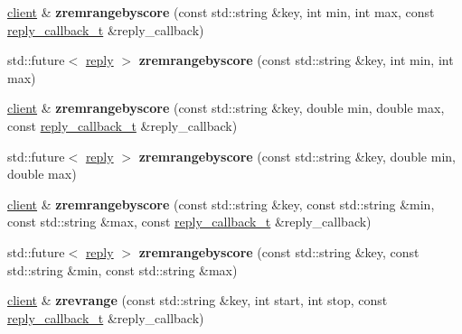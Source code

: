 \begin{DoxyCompactItemize}
\hyperlink{classcpp__redis_1_1client}{client} \& {\bfseries zremrangebyscore} (const std\+::string \&key, int min, int max, const \hyperlink{classcpp__redis_1_1client_a061a1140d36d2eaeda82b09a0bb3f9f2}{reply\+\_\+callback\+\_\+t} \&reply\+\_\+callback)
\item 
\mbox{\label{classcpp__redis_1_1client_a1317e67f2993b71bce596d28bce009b9}} 
std\+::future$<$ \hyperlink{classcpp__redis_1_1reply}{reply} $>$ {\bfseries zremrangebyscore} (const std\+::string \&key, int min, int max)
\item 
\mbox{\label{classcpp__redis_1_1client_a62354f918bcc9fd99562f1fe25dadec7}} 
\hyperlink{classcpp__redis_1_1client}{client} \& {\bfseries zremrangebyscore} (const std\+::string \&key, double min, double max, const \hyperlink{classcpp__redis_1_1client_a061a1140d36d2eaeda82b09a0bb3f9f2}{reply\+\_\+callback\+\_\+t} \&reply\+\_\+callback)
\item 
\mbox{\label{classcpp__redis_1_1client_ab40737e3dd44d39d708ab9e545f1d068}} 
std\+::future$<$ \hyperlink{classcpp__redis_1_1reply}{reply} $>$ {\bfseries zremrangebyscore} (const std\+::string \&key, double min, double max)
\item 
\mbox{\label{classcpp__redis_1_1client_a4a9c526f56dc158345f359961c9f9a7d}} 
\hyperlink{classcpp__redis_1_1client}{client} \& {\bfseries zremrangebyscore} (const std\+::string \&key, const std\+::string \&min, const std\+::string \&max, const \hyperlink{classcpp__redis_1_1client_a061a1140d36d2eaeda82b09a0bb3f9f2}{reply\+\_\+callback\+\_\+t} \&reply\+\_\+callback)
\item 
\mbox{\label{classcpp__redis_1_1client_afdef5244240e2c54c9738be66807e8f6}} 
std\+::future$<$ \hyperlink{classcpp__redis_1_1reply}{reply} $>$ {\bfseries zremrangebyscore} (const std\+::string \&key, const std\+::string \&min, const std\+::string \&max)
\item 
\mbox{\label{classcpp__redis_1_1client_ad408a62269d10de02605de9acec1ddc0}} 
\hyperlink{classcpp__redis_1_1client}{client} \& {\bfseries zrevrange} (const std\+::string \&key, int start, int stop, const \hyperlink{classcpp__redis_1_1client_a061a1140d36d2eaeda82b09a0bb3f9f2}{reply\+\_\+callback\+\_\+t} \&reply\+\_\+callback)

\end{DoxyCompactItemize}
